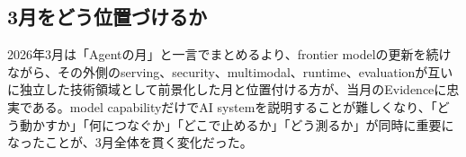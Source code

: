 \subsection*{3月をどう位置づけるか}
2026年3月は「Agentの月」と一言でまとめるより、frontier modelの更新を続けながら、その外側のserving、security、multimodal、runtime、evaluationが互いに独立した技術領域として前景化した月と位置付ける方が、当月のEvidenceに忠実である。model capabilityだけでAI systemを説明することが難しくなり、「どう動かすか」「何につなぐか」「どこで止めるか」「どう測るか」が同時に重要になったことが、3月全体を貫く変化だった。 \cite{src-eea6230f612a,src-7e670bf82538,src-18b7ee4fe5e4,src-ac36472a8f09,src-01572b4c34e9,src-0ec537ec1cc1}
